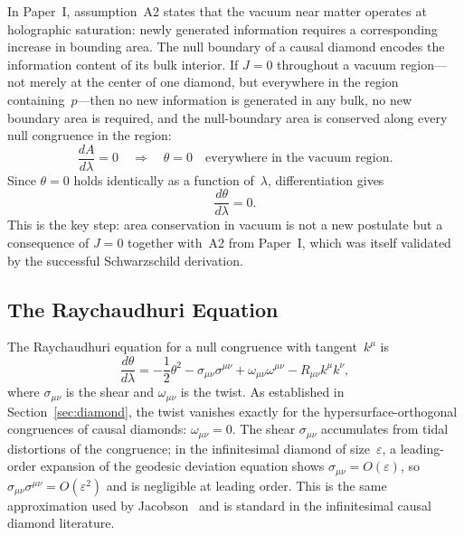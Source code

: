\documentclass[12pt]{article}
\begin{document}
In Paper~I, assumption~A2 states that the vacuum near matter
operates at holographic saturation: newly generated information
requires a corresponding increase in bounding area.
The null boundary of a causal diamond encodes the information
content of its bulk interior.
If $J=0$ throughout a vacuum region---not merely at the center
of one diamond, but everywhere in the region containing~$p$---then
no new information is generated in any bulk, no new boundary area
is required, and the null-boundary area is conserved along
every null congruence in the region:
\begin{equation}
  \frac{dA}{d\lambda} = 0
  \quad\Longrightarrow\quad
  \theta = 0
  \quad \text{everywhere in the vacuum region.}
  \label{eq:vacuum-conservation}
\end{equation}
Since $\theta=0$ holds identically as a function of~$\lambda$,
differentiation gives
\begin{equation}
  \frac{d\theta}{d\lambda} = 0. \label{eq:vacuum-dtheta}
\end{equation}
This is the key step: area conservation in vacuum is not a new
postulate but a consequence of $J=0$ together with~A2
from Paper~I, which was itself validated by the successful
Schwarzschild derivation.

\subsection{The Raychaudhuri Equation}

The Raychaudhuri equation for a null congruence with
tangent~$k^\mu$ is \cite{Wald1984}
\begin{equation}
  \frac{d\theta}{d\lambda}
  = -\frac{1}{2}\theta^2
    - \sigma_{\mu\nu}\sigma^{\mu\nu}
    + \omega_{\mu\nu}\omega^{\mu\nu}
    - R_{\mu\nu}k^\mu k^\nu,
  \label{eq:raychaudhuri}
\end{equation}
where $\sigma_{\mu\nu}$ is the shear and $\omega_{\mu\nu}$
is the twist.
As established in Section~\ref{sec:diamond}, the twist vanishes
exactly for the hypersurface-orthogonal congruences of causal
diamonds: $\omega_{\mu\nu}=0$.
The shear $\sigma_{\mu\nu}$ accumulates from tidal distortions
of the congruence; in the infinitesimal diamond of size~$\varepsilon$,
a leading-order expansion of the geodesic deviation equation shows
$\sigma_{\mu\nu}=O(\varepsilon)$, so
$\sigma_{\mu\nu}\sigma^{\mu\nu}=O(\varepsilon^2)$
and is negligible at leading order.
This is the same approximation used by Jacobson~\cite{Jacobson1995}
and is standard in the infinitesimal causal diamond literature.
\end{document}
